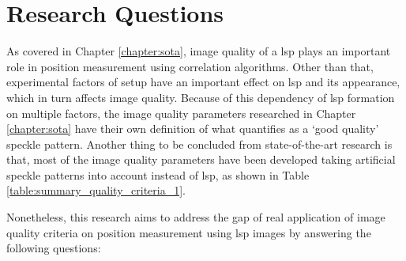 \chapter{Research Questions}\label{chap:research_questions}

As covered in Chapter \ref{chapter:sota}, image quality of a \gls{lsp} plays an important role in position measurement using correlation algorithms. Other than that, experimental factors of setup have an important effect on \gls{lsp} and its appearance, which in turn affects image quality. Because of this dependency of \gls{lsp} formation on multiple factors, the image quality parameters researched in Chapter \ref{chapter:sota} have their own definition of what quantifies as a `good quality' speckle pattern. Another thing to be concluded from state-of-the-art research is that, most of the image quality parameters have been developed taking artificial speckle patterns into account instead of \gls{lsp}, as shown in Table \ref{table:summary_quality_criteria_1}. 

\vspace{5mm}
\noindent Nonetheless, this research aims to address the gap of real application of image quality criteria on position measurement using \gls{lsp} images by answering the following questions:

